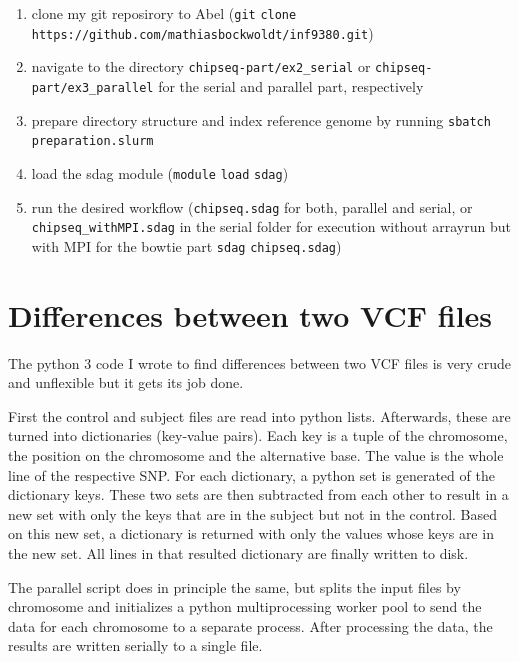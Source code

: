 \documentclass[paper=a4, 12pt]{scrartcl}
\begin{document}
\begin{flushleft}
\begin{enumerate}
\item clone my git reposirory to Abel (\texttt{git} \texttt{clone} \texttt{https://}\allowbreak\texttt{github.com/}\allowbreak\texttt{mathiasbockwoldt/}\allowbreak\texttt{inf9380.git})
\item navigate to the directory \texttt{chipseq-part/}\allowbreak\texttt{ex2\_serial} or \texttt{chipseq-part/}\allowbreak\texttt{ex3\_parallel} for the serial and parallel part, respectively
\item prepare directory structure and index reference genome by running \texttt{sbatch} \texttt{preparation.slurm}
\item load the sdag module (\texttt{module} \texttt{load} \texttt{sdag})
\item run the desired workflow (\texttt{chipseq.sdag} for both, parallel and serial, or \texttt{chipseq\_withMPI.sdag} in the serial folder for execution without arrayrun but with MPI for the bowtie part \texttt{sdag} \texttt{chipseq.sdag})
\end{enumerate}
\end{flushleft}


\section{Differences between two VCF files}

The python 3 code I wrote to find differences between two VCF files is very crude and unflexible but it gets its job done.

First the control and subject files are read into python lists. Afterwards, these are turned into dictionaries (key-value pairs). Each key is a tuple of the chromosome, the position on the chromosome and the alternative base. The value is the whole line of the respective SNP. For each dictionary, a python set is generated of the dictionary keys. These two sets are then subtracted from each other to result in a new set with only the keys that are in the subject but not in the control. Based on this new set, a dictionary is returned with only the values whose keys are in the new set. All lines in that resulted dictionary are finally written to disk.

The parallel script does in principle the same, but splits the input files by chromosome and initializes a python multiprocessing worker pool to send the data for each chromosome to a separate process. After processing the data, the results are written serially to a single file.
\end{document}
